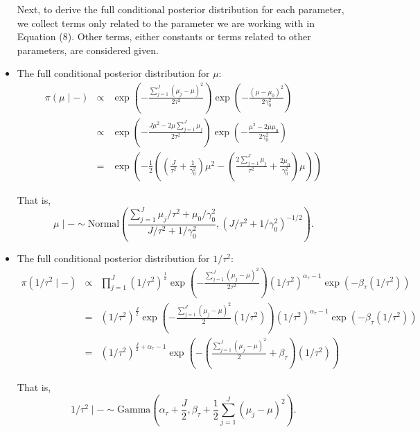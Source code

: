 \documentclass[11pt]{article}
\begin{document}
\begin{itemize}
Next, to derive the full conditional posterior distribution for each parameter, we collect terms only related to the parameter we are working with in Equation (8). Other terms, either constants or terms related to other parameters, are considered given.

\item The full conditional posterior distribution for $\mu$:
\begin{eqnarray}
\pi(\mu \mid -) &\propto& \exp\left(-\frac{\sum_{j=1}^{J}(\mu_j - \mu)^2}{2\tau^2}\right) \exp\left(-\frac{(\mu - \mu_0)^2}{2\gamma_0^2}\right) \nonumber \\
&\propto& \exp\left(-\frac{J\mu^2 - 2\mu \sum_{j=1}^{J}\mu_j}{2\tau^2}\right)\exp\left(-\frac{\mu^2 - 2\mu\mu_0}{2\gamma_0^2}\right) \nonumber \\
&=& \exp\left(-\frac{1}{2}\left(\left(\frac{J}{\tau^2} + \frac{1}{\gamma_0^2}\right)\mu^2 - \left(\frac{2\sum_{j=1}^{J}\mu_j}{\tau^2} + \frac{2\mu_0}{\gamma_0^2}\right)\mu\right)\right)
\end{eqnarray}

That is, 
\begin{equation}
\mu \mid - \sim \textrm{Normal}\left(\frac{\sum_{j=1}^{J}\mu_j/\tau^2 + \mu_0/\gamma_0^2}{J/\tau^2 + 1/\gamma_0^2}, (J/\tau^2 + 1/\gamma_0^2)^{-1/2} \right).
\end{equation}


\item The full conditional posterior distribution for $1/\tau^2$:
\begin{eqnarray}
\pi(1/\tau^2 \mid -) &\propto& \prod_{j=1}^{J}(1/\tau^2)^{\frac{1}{2}}\exp\left(-\frac{\sum_{j=1}^{J}(\mu_j - \mu)^2}{2\tau^2}\right)(1/\tau^2)^{\alpha_{\tau}-1}\exp(-\beta_{\tau}(1/\tau^2)) \nonumber \\
&=& (1/\tau^2)^{\frac{J}{2}}\exp\left(-\frac{\sum_{j=1}^{J}(\mu_j - \mu)^2}{2}(1/\tau^2)\right)(1/\tau^2)^{\alpha_{\tau}-1}\exp(-\beta_{\tau}(1/\tau^2)) \nonumber \\
&=& (1/\tau^2)^{\frac{J}{2} + \alpha_{\tau} - 1} \exp\left(-\left(\frac{\sum_{j=1}^{J}(\mu_j - \mu)^2}{2} + \beta_{\tau}\right) (1/\tau^2)\right)
\end{eqnarray}

That is,
\begin{equation}
1/\tau^2 \mid - \sim \textrm{Gamma}\left(\alpha_{\tau} + \frac{J}{2}, \beta_{\tau} + \frac{1}{2}\sum_{j=1}^{J}(\mu_j - \mu)^2\right).
\end{equation}



\end{itemize}
\end{document}
